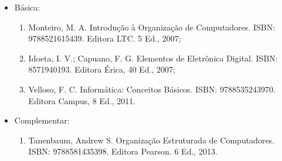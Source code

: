 \begin{itemize} 
   \item Básica:
	\begin{enumerate}
		\item Monteiro, M. A. Introdução à Organização de Computadores. ISBN: 9788521615439. Editora LTC. 5 Ed., 2007; 
		\item Idoeta, I. V.; Capuano, F. G. Elementos de Eletrônica Digital. ISBN: 8571940193. Editora Érica, 40 Ed., 2007;
		\item Velloso, F. C. Informática: Conceitos Básicos. ISBN: 9788535243970. Editora Campus, 8 Ed., 2011. 
	\end{enumerate}
  \item Complementar:
	\begin{enumerate} 
		\item Tanenbaum, Andrew S. Organização Estruturada de Computadores. ISBN: 9788581435398. Editora Pearson. 6 Ed., 2013.
	\end{enumerate}
\end{itemize}
